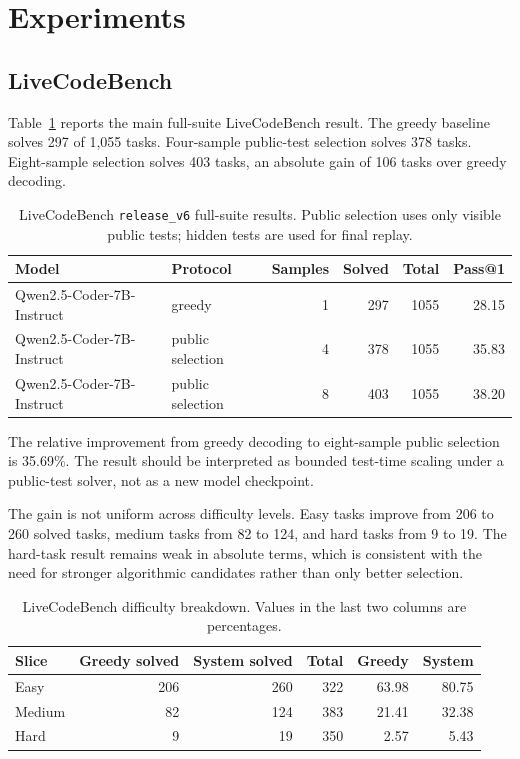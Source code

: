 \documentclass[11pt]{article}
\begin{document}
\section{Experiments}

\subsection{LiveCodeBench}

Table~\ref{tab:lcb-main} reports the main full-suite LiveCodeBench result. The
greedy baseline solves 297 of 1,055 tasks. Four-sample public-test selection
solves 378 tasks. Eight-sample selection solves 403 tasks, an absolute gain of
106 tasks over greedy decoding.

\begin{table}[H]
\centering
\begin{tabular}{llrrrr}
\toprule
Model & Protocol & Samples & Solved & Total & Pass@1 \\
\midrule
Qwen2.5-Coder-7B-Instruct & greedy & 1 & 297 & 1055 & 28.15 \\
Qwen2.5-Coder-7B-Instruct & public selection & 4 & 378 & 1055 & 35.83 \\
Qwen2.5-Coder-7B-Instruct & public selection & 8 & 403 & 1055 & 38.20 \\
\bottomrule
\end{tabular}
\caption{LiveCodeBench \texttt{release\_v6} full-suite results. Public
selection uses only visible public tests; hidden tests are used for final replay.}
\label{tab:lcb-main}
\end{table}

The relative improvement from greedy decoding to eight-sample public selection
is 35.69\%. The result should be interpreted as bounded test-time scaling under
a public-test solver, not as a new model checkpoint.

The gain is not uniform across difficulty levels. Easy tasks improve from 206
to 260 solved tasks, medium tasks from 82 to 124, and hard tasks from 9 to 19.
The hard-task result remains weak in absolute terms, which is consistent with
the need for stronger algorithmic candidates rather than only better selection.

\begin{table}[H]
\centering
\begin{tabular}{lrrrrr}
\toprule
Slice & Greedy solved & System solved & Total & Greedy & System \\
\midrule
Easy & 206 & 260 & 322 & 63.98 & 80.75 \\
Medium & 82 & 124 & 383 & 21.41 & 32.38 \\
Hard & 9 & 19 & 350 & 2.57 & 5.43 \\
\bottomrule
\end{tabular}
\caption{LiveCodeBench difficulty breakdown. Values in the last two columns are
percentages.}
\label{tab:lcb-breakdown}
\end{table}
\end{document}
